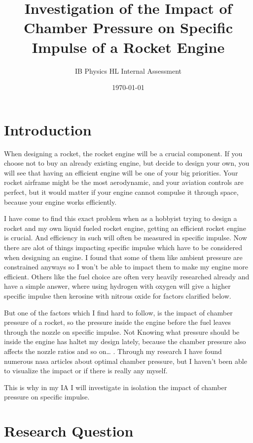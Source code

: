 \documentclass[12pt,a4paper]{article}
\title{\textbf{Investigation of the Impact of Chamber Pressure on Specific Impulse of a Rocket Engine}}
\author{IB Physics HL Internal Assessment}
\date{\today}
\begin{document}
\maketitle
\thispagestyle{empty}

\newpage
\tableofcontents
\newpage

\section{Introduction}

When designing a rocket, the rocket engine will be a crucial component. If you choose not to buy an already existing engine, but decide to design your own, you will see that having an efficient engine will be one of your big priorities. Your rocket airframe might be the most aerodynamic, and your aviation controls are perfect, but it would matter if your engine cannot compulse it through space, because your engine works efficiently.

I have come to find this exact problem when as a hobbyist trying to design a rocket and my own liquid fueled rocket engine, getting an efficient rocket engine is crucial. And efficiency in such will often be measured in specific impulse. Now there are alot of things impacting specific impulse which have to be considered when designing an engine. I found that some of them like ambient pressure are constrained anyways so I won't be able to impact them to make my engine more efficient. Others like the fuel choice are often very heavily researched already and have a simple answer, where using hydrogen with oxygen will give a higher specific impulse then kerosine with nitrous oxide for factors clarified below.

But one of the factors which I find hard to follow, is the impact of chamber pressure of a rocket, so the pressure inside the engine before the fuel leaves through the nozzle on specific impulse. Not Knowing what pressure should be inside the engine has haltet my design lately, because the chamber pressure also affects the nozzle ratios and so on… . Through my research I have found numerous nasa articles about optimal chamber pressure, but I haven't been able to visualize the impact or if there is really any myself.

This is why in my IA I will investigate in isolation the impact of chamber pressure on specific impulse.

\section{Research Question}
\end{document}
